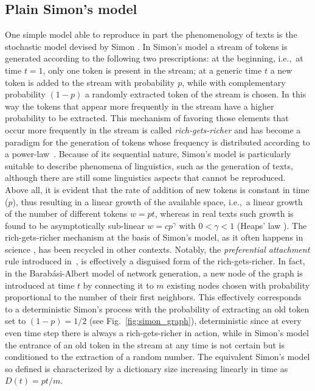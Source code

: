 \documentclass[graybox]{svmult}
\begin{document}
\subsection{Plain Simon's model}
One simple model able to reproduce in part the phenomenology of texts is the stochastic model devised by Simon \cite{simon-mandel-dispute}. 
In Simon's model a stream of tokens is generated according to the following two prescriptions: 
at the beginning, i.e.,\ at time $t=1$, only one token is present in the stream; 
at a generic time $t$ a new token is added to the stream with probability $p$, while with complementary probability $(1-p)$ a randomly extracted token of the stream is chosen.
In this way the tokens that appear more frequently in the stream have a higher probability to be extracted.
This mechanism of favoring those elements that occur more frequently in the stream is called \emph{rich-gets-richer} and has become a paradigm for the generation of tokens whose frequency is distributed according to a power-law~\cite{simkin2011}. 
Because of its sequential nature, Simon's model is particularly suitable to describe phenomena of linguistics, such as the generation of texts, although there are still some linguistics aspects that cannot be reproduced.
Above all, it is evident that the rate of addition of new tokens is constant in time ($p$), thus resulting in a linear growth of the available space, i.e.,\ a linear growth of the number of different tokens $w=pt$, whereas in real texts such growth is found to be asymptotically sub-linear $w=cp^\gamma$ with $0<\gamma<1$ (Heaps' law \cite{heaps78}).   
The rich-gets-richer mechanism at the basis of Simon's model, as it often happens in science \cite{simkin2011}, has been recycled in other contexts. 
Notably, the \emph{preferential attachment} rule introduced in~\cite{barabasi99}, is effectively a disguised form of the rich-gets-richer.
In fact, in the Barab\'asi-Albert model of network generation, a new node of the graph is introduced at time $t$ by connecting it to  $m$ existing nodes chosen with probability proportional to the number of their first neighbors. 
This effectively corresponds to a deterministic Simon's process with the probability of extracting an old token set to $(1-p)=1/2$ (see Fig.~\ref{fig:simon_graph}), deterministic since at every even time step there is always a rich-gets-richer in action, while in Simon's model the entrance of an old token in the stream at any time is not certain but is conditioned to the extraction of a random number. 
The equivalent Simon's model so defined is characterized by a dictionary size increasing linearly in time as $D(t)=pt/m$.
\end{document}
